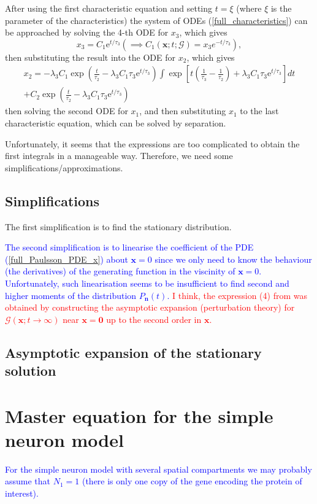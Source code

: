 \documentclass[a4paper, 11pt]{article}
\begin{document}
After using the first characteristic equation and setting $t = \xi$ (where $\xi$ is the parameter of the characteristics) the system of ODEs (\ref{full_characteristics}) can be approached by solving the 4-th ODE for $x_3$, which gives
\begin{equation}
  x_3 = C_1\mathrm e^{t/\tau_3} \left(\implies C_1(\mathbf x; t; \mathcal G) = x_3e^{-t/\tau_3}\right),
\end{equation}
then substituting the result into the ODE for $x_2$, which gives
\begin{equation}
  \begin{split}
    x_2 = -\lambda_3C_1\exp\left(\frac{t}{\tau_2}-\lambda_3C_1\tau_3\mathrm e^{t/\tau_3}\right)\int\exp\left[t\left(\frac{1}{\tau_3} - \frac{1}{\tau_2}\right) + \lambda_3C_1\tau_3\mathrm e^{t/\tau_3}\right]dt\\ + C_2\exp\left(\frac{t}{\tau_2}-\lambda_3C_1\tau_3\mathrm e^{t/\tau_3}\right)
  \end{split}
\end{equation}
then solving the second ODE for $x_1$, and then substituting $x_1$ to the last characteristic equation, which can be solved by separation.

Unfortunately, it seems that the expressions are too complicated to obtain the first integrals in a manageable way. Therefore, we need some simplifications/approximations.

\subsection{Simplifications}

The first simplification is to find the stationary distribution.

\textcolor{blue}{The second simplification is to linearise the coefficient of the PDE (\ref{full_Paulsson_PDE_x}) about $\mathbf x = 0$ since we only need to know the behaviour (the derivatives) of the generating function in the viscinity of $\mathbf x = 0$. Unfortunately, such linearisation seems to be insufficient to find second and higher moments of the distribution $P_{\mathbf n}(t)$.} \textcolor{red}{I think, the expression (4) from \cite{PAULSSON2005157} was obtained by constructing the asymptotic expansion (perturbation theory) for $\mathcal G(\mathbf x; t\to\infty)$ near $\mathbf x=\mathbf 0$ up to the second order in $\mathbf x$.}

\subsection{Asymptotic expansion of the stationary solution}



\section{Master equation for the simple neuron model}
\textcolor{blue}{For the simple neuron model with several spatial compartments we may probably assume that $N_1=1$ (there is only one copy of the gene encoding the protein of interest).}




\end{document}
